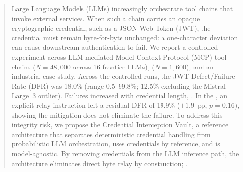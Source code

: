 %

\begin{abstract}
Large Language Models (LLMs) increasingly orchestrate tool chains that invoke
external services. When such a chain carries an opaque cryptographic
credential, such as a JSON Web Token (JWT), the credential must remain
byte-for-byte unchanged: a one-character deviation can cause downstream
authentication to fail. We report a controlled experiment across
LLM-mediated Model Context Protocol (MCP) tool chains ($N\!=\!48{,}000$ 
across 16 frontier LLMs), 
($N\!=\!1{,}600$), and an industrial case
study. Across the controlled runs, the JWT Defect/Failure Rate (DFR) was
18.0\% (range 0.5--99.8\%; 12.5\% excluding the Mistral Large~3 outlier).
Failures increased with credential length, . In the ,
an explicit relay instruction left
a residual DFR of 19.9\% ($+1.9$~pp, $p\!=\!0.16$), showing the mitigation
does not eliminate the failure. To address this integrity risk, we propose the
Credential Interception Vault, a reference architecture that separates
deterministic credential handling from probabilistic LLM orchestration, uses
credentials by reference, and is model-agnostic. By removing credentials from
the LLM inference path, the architecture eliminates direct byte relay by
construction; .
\end{abstract}
